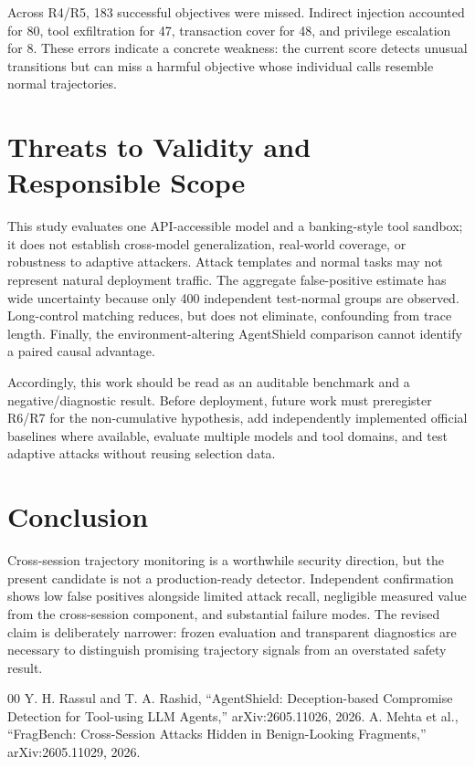 \documentclass[10pt,conference]{IEEEtran}
\begin{document}
Across R4/R5, 183 successful objectives were missed. Indirect injection accounted for 80, tool exfiltration for 47, transaction cover for 48, and privilege escalation for 8. These errors indicate a concrete weakness: the current score detects unusual transitions but can miss a harmful objective whose individual calls resemble normal trajectories.

\section{Threats to Validity and Responsible Scope}
This study evaluates one API-accessible model and a banking-style tool sandbox; it does not establish cross-model generalization, real-world coverage, or robustness to adaptive attackers. Attack templates and normal tasks may not represent natural deployment traffic. The aggregate false-positive estimate has wide uncertainty because only 400 independent test-normal groups are observed. Long-control matching reduces, but does not eliminate, confounding from trace length. Finally, the environment-altering AgentShield comparison cannot identify a paired causal advantage.

Accordingly, this work should be read as an auditable benchmark and a negative/diagnostic result. Before deployment, future work must preregister R6/R7 for the non-cumulative hypothesis, add independently implemented official baselines where available, evaluate multiple models and tool domains, and test adaptive attacks without reusing selection data.

\section{Conclusion}
Cross-session trajectory monitoring is a worthwhile security direction, but the present candidate is not a production-ready detector. Independent confirmation shows low false positives alongside limited attack recall, negligible measured value from the cross-session component, and substantial failure modes. The revised claim is deliberately narrower: frozen evaluation and transparent diagnostics are necessary to distinguish promising trajectory signals from an overstated safety result.

\begin{thebibliography}{00}
 Y. H. Rassul and T. A. Rashid, ``AgentShield: Deception-based Compromise Detection for Tool-using LLM Agents,'' arXiv:2605.11026, 2026.
 A. Mehta et al., ``FragBench: Cross-Session Attacks Hidden in Benign-Looking Fragments,'' arXiv:2605.11029, 2026.
\end{thebibliography}
\end{document}
